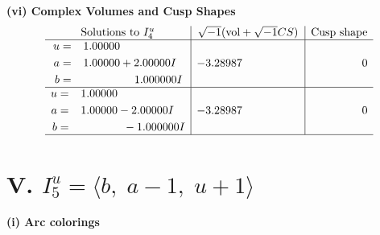 \documentclass[1p]{elsarticle_modified}
\theoremstyle{definition}
\newcommand{\I}{\sqrt{-1}}
\begin{document}
\newpage\flushleft \textbf{(vi) Complex Volumes and Cusp Shapes}
$$\begin{array}{c|c|c}  
\text{Solutions to }I^u_{4}& \I (\text{vol} + \sqrt{-1}CS) & \text{Cusp shape}\\
 \hline 
\begin{aligned}
u &= \phantom{-}1.00000\phantom{ +0.000000I} \\
a &= \phantom{-}1.00000 + 2.00000 I \\
b &= \phantom{-0.000000 -}1.000000 I\end{aligned}
 & -3.28987\phantom{ +0.000000I} & \phantom{-0.000000 } 0 \\ \hline\begin{aligned}
u &= \phantom{-}1.00000\phantom{ +0.000000I} \\
a &= \phantom{-}1.00000 - 2.00000 I \\
b &= \phantom{-0.000000 } -1.000000 I\end{aligned}
 & -3.28987\phantom{ +0.000000I} & \phantom{-0.000000 } 0\\
 \hline 
 \end{array}$$\newpage\newpage\renewcommand{\arraystretch}{1}
\centering \section*{V. $I^u_{5}= \langle b,\;a-1,\;u+1 \rangle$}
\flushleft \textbf{(i) Arc colorings}\\
\end{document}
